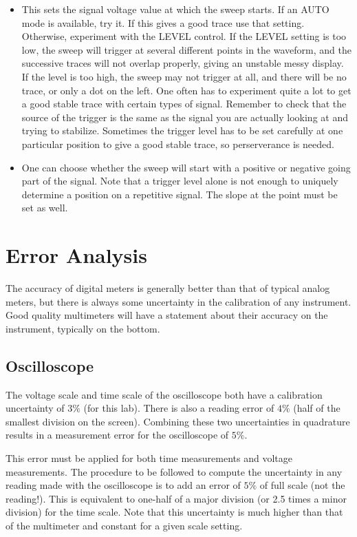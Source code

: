 \documentclass[12pt, a4paper, oneside, openright, titlepage]{book}
\begin{document}
\begin{enumerate}
\begin{itemize}
            \item {} This sets the signal voltage value at which the sweep starts. If an AUTO mode is available, try it. If this gives a good trace use that setting. Otherwise, experiment with the LEVEL control. If the LEVEL setting is too low, the sweep will trigger at several different points in the waveform, and the successive traces will not overlap properly, giving an unstable messy display. If the level is too high, the sweep may not trigger at all, and there will be no trace, or only a dot on the left. One often has to experiment quite a lot to get a good stable trace with certain types of signal. Remember to check that the source of the trigger is the same as the signal you are actually looking at and trying to stabilize. Sometimes the trigger level has to be set carefully at one particular position to give a good stable trace, so perserverance is needed.
            \item {} One can choose whether the sweep will start with a positive or negative going part of the signal. Note that a trigger level alone is not enough to uniquely determine a position on a repetitive signal. The slope at the point must be set as well.
        \end{itemize}
\end{enumerate}


\section{Error Analysis}


The accuracy of digital meters is generally better than that of typical analog meters, but there is always some uncertainty in the calibration of any instrument. Good quality multimeters will have a statement about their accuracy on the instrument, typically on the bottom.

\subsection{Oscilloscope}

The voltage scale and time scale of the oscilloscope both have a calibration uncertainty of $3\%$ (for this lab). There is also a reading error of $4\%$ (half of the smallest division on the screen). Combining these two uncertainties in quadrature results in a measurement error for the oscilloscope of $5\%$.

\noindent This error must be applied for both time measurements and voltage measurements. The procedure to be followed to compute the uncertainty in any reading made with the oscilloscope is to add an error of $5\%$ of full scale (not the reading!). This is equivalent to one-half of a major division (or 2.5 times a minor division) for the time scale. Note that this uncertainty is much higher than that of the multimeter and constant for a given scale setting.
\end{document}

